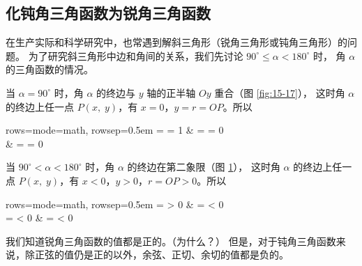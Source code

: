 \subsection{化钝角三角函数为锐角三角函数}\label{subsec:15-7}

在生产实际和科学研究中，也常遇到解斜三角形（锐角三角形或钝角三角形）的问题。
为了研究斜三角形中边和角间的关系，我们先讨论 $90^\circ \leqslant \alpha < 180^\circ$ 时，
角 $\alpha$ 的三角函数的情况。

当 $\alpha = 90^\circ$ 时，角 $\alpha$ 的终边与 $y$ 轴的正半轴 $Oy$ 重合（图 \ref{fig:15-17}），
这时角 $\alpha$ 的终边上任一点 $P(x,\; y)$，有 $x = 0$，$y = r = OP$。所以
\begin{center}
    \begin{tblr}{rows={mode=math, rowsep=0.5em}}
         =  = 1 \douhao &  =  = 0 \douhao \\
          \douhao &  =  = 0 \juhao
    \end{tblr}
\end{center}

\begin{figure}[htbp]
    \centering
    \begin{minipage}[b]{6.5cm}
        \centering
        
        \caption{}\label{fig:15-17}
    \end{minipage}
    \qquad
    \begin{minipage}[b]{8cm}
        \centering
        
        \caption{}\label{fig:15-18}
    \end{minipage}
\end{figure}


当 $90^\circ < \alpha < 180^\circ$ 时，角 $\alpha$ 的终边在第二象限（图 \ref{fig:15-18}），
这时角 $\alpha$ 的终边上任一点 $P(x,\; y)$，有 $x < 0$，$y > 0$，$r = OP > 0$。所以
\begin{center}
    \begin{tblr}{rows={mode=math, rowsep=0.5em}}
        \sin{\alpha} =  > 0 \douhao & \cos{\alpha} =  < 0 \douhao \\
        \tan{\alpha} =  < 0 \douhao & \cot{\alpha} =  < 0 \juhao
    \end{tblr}
\end{center}

我们知道锐角三角函数的值都是正的。（为什么？）
但是，对于钝角三角函数来说，除正弦的值仍是正的以外，余弦、正切、余切的值都是负的。


